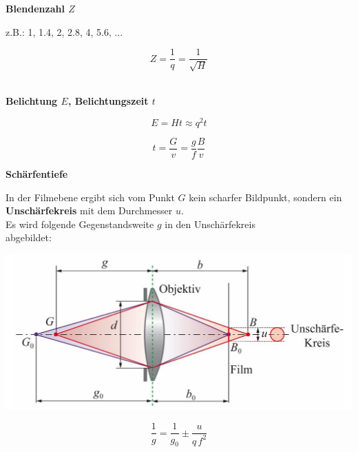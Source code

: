 \textbf{Blendenzahl  $Z$} 

\begin{minipage}{0.48\linewidth}
z.B.: 1, 1.4, 2, 2.8, 4, 5.6, ... \\
\end{minipage}
\hfill
\begin{minipage}{0.48\linewidth}
$$ \boxed{ Z = \frac{1}{q} = \frac{1}{\sqrt{H}}  } $$ \\
\end{minipage}



\textbf{Belichtung $E$, Belichtungszeit $t$} 

\begin{minipage}{0.4\linewidth}
	$$ \boxed{ E = Ht \approx q^2t } $$
\end{minipage}
\hfill
\begin{minipage}{0.55\linewidth}
	$$ \boxed{t = \frac{G}{v} = \frac{g}{f}\frac{B}{v}} $$
\end{minipage} 


\textbf{Schärfentiefe} 

In der Filmebene ergibt sich vom Punkt $G$ kein scharfer Bildpunkt,
sondern ein \textbf{Unschärfekreis} mit dem Durchmesser $u$. \\


Es wird folgende Gegenstandsweite $g$ in den Unschärfekreis \\
abgebildet:


\begin{minipage}{0.65\linewidth}
\includegraphics[width=\linewidth]{Bilder/Wellen-Optik/schaerfentiefe}
\end{minipage}
\hfill
\begin{minipage}{0.3\linewidth}
$$\boxed{ \frac{1}{g} = \frac{1}{g_0} \pm \frac{u}{q \, f^2}  } $$
\end{minipage}




